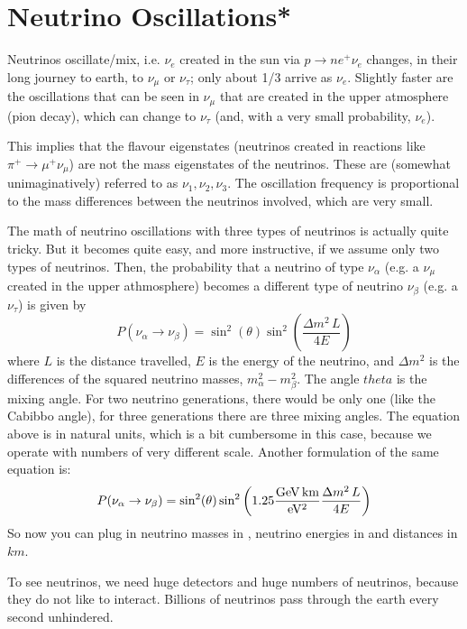 \section{Neutrino Oscillations*}
Neutrinos oscillate/mix, i.e. $\nu_e$ created in the sun via $p \to n e^+ \nu_e$ changes, in their long journey to earth, to $\nu_{\mu}$ or $\nu_{\tau}$; only about 1/3 arrive as $\nu_e$. Slightly faster are the oscillations that can be seen in $\nu_{\mu}$ that are created in the upper atmosphere (pion decay), which can change to $\nu_{\tau}$ (and, with a very small probability, $\nu_e$).

This implies that the flavour eigenstates (neutrinos created in reactions like $\pi^+ \to \mu^+ \nu_{\mu}$) are not the mass eigenstates of the neutrinos. These are (somewhat unimaginatively) referred to as $\nu_1, \nu_2, \nu_3$. The oscillation frequency is proportional to the mass differences between the neutrinos involved, which are very small.

The math of neutrino oscillations with three types of neutrinos is actually quite tricky. But it becomes quite easy, and more instructive, if we assume only two types of neutrinos. Then, the probability that a neutrino of type $\nu_{\alpha}$ (e.g. a $\nu_{\mu}$ created in the upper athmosphere) becomes a different type of neutrino $\nu_{\beta}$ (e.g. a $\nu_{\tau}$) is given by
\begin{equation}
    P(\nu_{\alpha} \to \nu_{\beta})
    =
    \sin^2(\theta) \sin^2\left( \frac{\Delta m^2 \,L}{4E} \right)
\end{equation}
where $L$ is the distance travelled, $E$ is the energy of the neutrino, and $\Delta m^2$ is the differences of the squared neutrino masses, $m_{\alpha}^2 - m_{\beta}^2$. The angle $theta$ is the mixing angle. For two neutrino generations, there would be only one (like the Cabibbo angle), for three generations there are three mixing angles. The equation above is in natural units, which is a bit cumbersome in this case, because we operate with numbers of very different scale. Another formulation of the same equation is:
\begin{equation}
    P(\nu_{\alpha} \to \nu_{\beta})
    =
    \sin^2(\theta) \sin^2\left( 1.25 \frac{\mathrm{GeV\,km}}{\mathrm{eV^2}}\frac{\Delta m^2 \,L}{4E} \right)
\end{equation}
So now you can plug in neutrino masses in , neutrino energies in  and distances in $km$.

To see neutrinos, we need huge detectors and huge numbers of neutrinos, because they do not like to interact. Billions of neutrinos pass through the earth every second unhindered.


